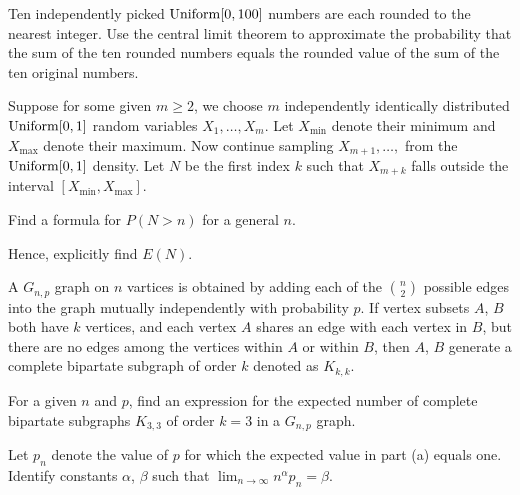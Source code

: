 \begin{problem}
  Ten independently picked \(\operatorname{Uniform}[0,100]\) numbers are each rounded to
  the nearest integer. Use the central limit theorem to approximate the
  probability that the sum of the ten rounded numbers equals the rounded
  value of the sum of the ten original numbers.
\end{problem}
\begin{solution*}
\end{solution*}

\begin{problem}
  Suppose for some given \(m\geq 2\), we choose \(m\) independently
  identically distributed \(\operatorname{Uniform}[0,1]\) random variables
  \(X_1,\dotsc,X_m\). Let \(X_{\text{min}}\) denote their minimum and
  \(X_{\text{max}}\) denote their maximum. Now continue sampling
  \(X_{m+1},\dotsc,\) from the \(\operatorname{Uniform}[0,1]\) density. Let \(N\) be the
  first index \(k\) such that \(X_{m+k}\) falls outside the interval
  \([X_{\text{min}},X_{\text{max}}]\).
  \begin{alphlist}
  \item Find a formula for \(P(N>n)\) for a general \(n\).
  \item Hence, explicitly find \(E(N)\).
  \end{alphlist}
\end{problem}
\begin{solution*}
\end{solution*}

\begin{problem}
  A \(G_{n,p}\) graph on \(n\) vartices is obtained by adding each of the
  \(\binom{n}{2}\) possible edges into the graph mutually independently
  with probability \(p\). If vertex subsets \(A\), \(B\) both have \(k\)
  vertices, and each vertex \(A\) shares an edge with each vertex in \(B\),
  but there are no edges among the vertices within \(A\) or within \(B\),
  then \(A\), \(B\) generate a complete bipartate subgraph of order \(k\)
  denoted as \(K_{k,k}\).
  \begin{alphlist}
  \item For a given \(n\) and \(p\), find an expression for the
    expected number of complete bipartate subgraphs \(K_{3,3}\) of order
    \(k=3\) in a \(G_{n,p}\) graph.
  \item Let \(p_n\) denote the value of \(p\) for which the expected
    value in part (a) equals one. Identify constants \(\alpha\), \(\beta\)
    such that \(\lim_{n\to\infty}n^\alpha p_n=\beta\).
  \end{alphlist}
\end{problem}
\begin{solution*}
\end{solution*}

